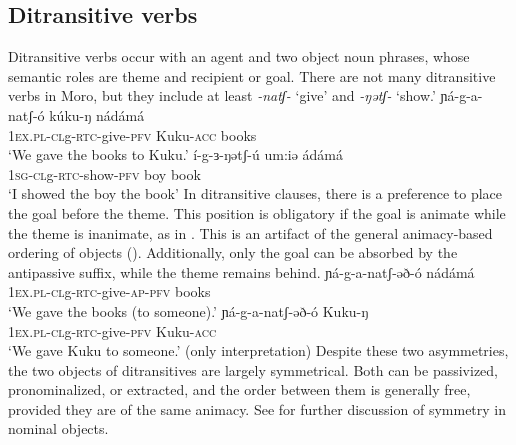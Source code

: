 \subsection{Ditransitive verbs}

Ditransitive verbs occur with an agent and two object noun phrases, whose semantic roles are  theme and recipient or goal. There are not many ditransitive verbs in Moro, but they include at least \textit{-natʃ-} `give' and   \textit{-ŋətʃ-} `show.'
\ea \gll ɲá-g-a-natʃ-ó kúku-ŋ nádámá\\
 		\textsc{1ex.pl-cl}g-\textsc{rtc-}give-\textsc{pfv} Kuku-\textsc{acc} books\\
		\glt `We gave the books to Kuku.'\label{ex:ch12:give}
\ex  
	\gll 	í-g-ɜ-ŋətʃ-ú	um:iə ádámá\\
			\textsc{1sg-cl}g-\textsc{rtc}-show-\textsc{pfv} boy book\\
	\glt 	`I showed the boy the book'
\z 
In ditransitive clauses, there is a preference to place the goal before the theme. This position is obligatory if the goal is animate while the theme is inanimate, as in . This is an artifact of the general animacy-based ordering of objects (). Additionally, only the goal can be absorbed by the antipassive suffix, while the theme remains behind.
\ea
	\ea \gll ɲá-g-a-natʃ-əð-ó nádámá\\
 		\textsc{1ex.pl-cl}g-\textsc{rtc-}give-\textsc{ap-pfv}  books\\
		\glt ‘We gave the books (to someone).’ \label{ex:ch12:giveap}
	\ex \gll ɲá-g-a-natʃ-əð-ó Kuku-ŋ\\
 		\textsc{1ex.pl-cl}g-\textsc{rtc-}give-\textsc{pfv} Kuku-\textsc{acc}\\
		\glt ‘We gave Kuku to someone.’ (only interpretation)
	\z 
\z 
Despite these two asymmetries, the two objects of ditransitives are largely symmetrical. Both can be passivized, pronominalized, or extracted, and the order between them is generally free, provided they are of the same animacy. See  for further discussion of symmetry in nominal objects. 

